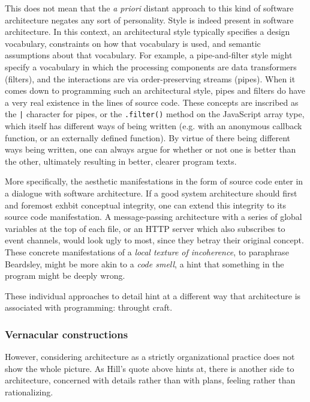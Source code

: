 This does not mean that the \emph{a priori} distant approach to this kind of software architecture negates any sort of personality. Style is indeed present in software architecture. In this context, an architectural style typically specifies a design vocabulary, constraints on how that vocabulary is used, and semantic assumptions about that vocabulary. For example, a pipe-and-filter style might specify a vocabulary in which the processing components are data transformers (filters), and the interactions are via order-preserving streams (pipes). When it comes down to programming such an architectural style, pipes and filters do have a very real existence in the lines of source code. These concepts are inscribed as the \lstinline{|} character for pipes, or the \lstinline{.filter()} method on the JavaScript array type, which itself has different ways of being written (e.g. with an anonymous callback function, or an externally defined function). By virtue of there being different ways being written, one can always argue for whether or not one is better than the other, ultimately resulting in better, clearer program texts.

More specifically, the aesthetic manifestations in the form of source code enter in a dialogue with software architecture. If a good system architecture should first and foremost exhbit conceptual integrity\cite{spinellis_beautiful_2009}, one can extend this integrity to its source code manifestation. A message-passing architecture with a series of global variables at the top of each file, or an HTTP server which also subscribes to event channels, would look ugly to most, since they betray their original concept. These concrete manifestations of a \emph{local texture of incoherence}, to paraphrase Beardsley, might be more akin to a \emph{code smell}, a hint that something in the program might be deeply wrong.

These individual approaches to detail hint at a different way that architecture is associated with programming: throught craft.

\subsubsection{Vernacular constructions}
\label{subsubsec:vernacular-construction}

However, considering architecture as a strictly organizational practice does not show the whole picture. As Hill's quote above hints at, there is another side to architecture, concerned with details rather than with plans, feeling rather than rationalizing.

